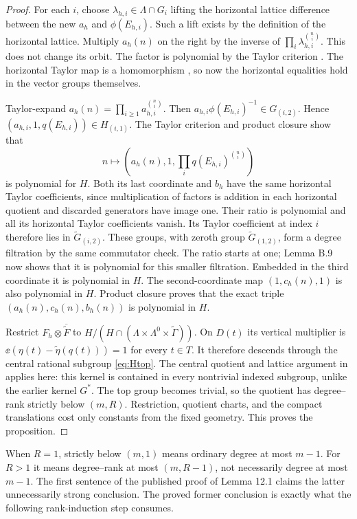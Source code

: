\documentclass[11pt]{article}
\begin{document}
\begin{proof}
For each $i$, choose $\lambda_{h,i}\in\Lambda\cap G_i$ lifting the
horizontal lattice difference between the new $a_h$ and $\phi(E_{h,i})$.
Such a lift exists by the definition of the horizontal lattice. Multiply
$a_h(n)$ on the right by the inverse of
$\prod_i\lambda_{h,i}^{\binom ni}$. This does not change its orbit.
The factor is polynomial by the Taylor criterion
\cite[Lemma B.9]{GTZ}. The horizontal Taylor map is a homomorphism
\cite[Definition 9.6 and the argument following it]{GTZ}, so now the
horizontal equalities hold in the vector groups themselves.

Taylor-expand $a_h(n)=\prod_{i\geq1}a_{h,i}^{\binom ni}$. Then
$a_{h,i}\phi(E_{h,i})^{-1}\in G_{(i,2)}$. Hence
$(a_{h,i},1,q(E_{h,i}))\in H_{(i,1)}$. The Taylor criterion and product
closure \cite[Lemma B.9 and Corollary B.4]{GTZ} show that
\[
 n\mapsto\left(a_h(n),1,\prod_iq(E_{h,i})^{\binom ni}\right)
\]
is polynomial for $H$. Both its last coordinate and $b_h$ have the same
horizontal Taylor coefficients, since multiplication of factors is addition
in each horizontal quotient and discarded generators have image one.
Their ratio is polynomial and all its horizontal Taylor coefficients vanish.
Its Taylor coefficient at index $i$ therefore lies in
$\widetilde G_{(i,2)}$. These groups, with zeroth group
$\widetilde G_{(1,2)}$, form a degree filtration by the same commutator
check. The ratio starts at one; Lemma B.9 now shows that it is polynomial
for this smaller filtration. Embedded in the third coordinate it is
polynomial in $H$. The second-coordinate map $(1,c_h(n),1)$ is also
polynomial in $H$. Product closure proves that the exact triple
$(a_h(n),c_h(n),b_h(n))$ is polynomial in $H$.

Restrict $F_h\otimes\overline{\widetilde F}$ to
$H/(H\cap(\Lambda\times\Lambda^0\times\widetilde\Gamma))$.
On $D(t)$ its vertical multiplier is
$\ee(\eta(t)-\widetilde\eta(q(t)))=1$ for every $t\in T$.
It therefore descends through the central rational subgroup
\eqref{eq:Htop}. The central quotient and lattice argument in
\cite[Sections 2 and 6]{LP13} applies here: this kernel is contained in
every nontrivial indexed subgroup, unlike the earlier kernel $G^*$.
The top group becomes trivial, so the quotient has degree--rank strictly
below $(m,R)$. Restriction, quotient charts, and the compact translations
cost only constants from the fixed geometry. This proves the proposition.
\end{proof}

When $R=1$, strictly below $(m,1)$ means ordinary degree at most $m-1$.
For $R>1$ it means degree--rank at most $(m,R-1)$, not necessarily degree
at most $m-1$. The first sentence of the published proof of Lemma 12.1
claims the latter unnecessarily strong conclusion. The proved former
conclusion is exactly what the following rank-induction step consumes.
\end{document}
